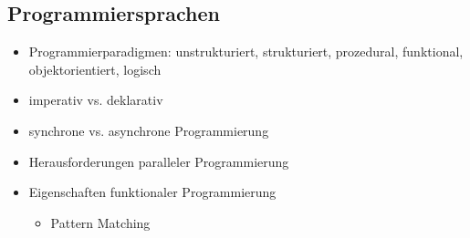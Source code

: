 \subsection{Programmiersprachen}
\label{sec:Programmiersprachen}

\begin{itemize}
	\item Programmierparadigmen: unstrukturiert, strukturiert, prozedural, funktional, objektorientiert, logisch
	\item imperativ vs. deklarativ
	\item synchrone vs. asynchrone Programmierung
	\item Herausforderungen paralleler Programmierung
	\item Eigenschaften funktionaler Programmierung
	\begin{itemize}
		\item Pattern Matching
	\end{itemize}
\end{itemize}